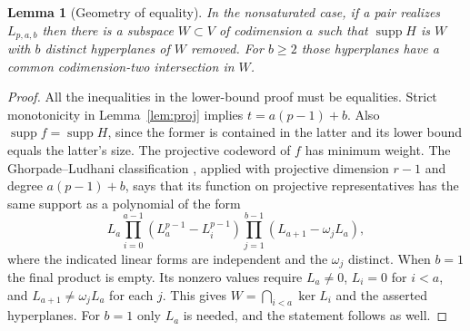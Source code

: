 \documentclass[11pt]{article}
\newtheorem{lemma}[theorem]{Lemma}
\theoremstyle{remark}\newtheorem{remark}[theorem]{Remark}
\newcommand{\supp}{\operatorname{supp}}
\begin{document}
\begin{lemma}[Geometry of equality]\label{lem:geometry}
In the nonsaturated case, if a pair realizes $L_{p,a,b}$ then there is a subspace $W\subset V$ of codimension $a$ such that $\supp H$ is $W$ with $b$ distinct hyperplanes of $W$ removed. For $b\ge2$ those hyperplanes have a common codimension-two intersection in $W$.
\end{lemma}
\begin{proof}
All the inequalities in the lower-bound proof must be equalities. Strict monotonicity in Lemma~\ref{lem:proj} implies $t=a(p-1)+b$. Also $\supp f=\supp H$, since the former is contained in the latter and its lower bound equals the latter's size. The projective codeword of $f$ has minimum weight. The Ghorpade--Ludhani classification \cite[Theorem 4.3]{GL}, applied with projective dimension $r-1$ and degree $a(p-1)+b$, says that its function on projective representatives has the same support as a polynomial of the form
\[
 L_a\prod_{i=0}^{a-1}(L_a^{p-1}-L_i^{p-1})
 \prod_{j=1}^{b-1}(L_{a+1}-\omega_jL_a),
\]
where the indicated linear forms are independent and the $\omega_j$ distinct. When $b=1$ the final product is empty. Its nonzero values require $L_a\ne0$, $L_i=0$ for $i<a$, and $L_{a+1}\ne\omega_j L_a$ for each $j$. This gives $W=\bigcap_{i<a}\ker L_i$ and the asserted hyperplanes. For $b=1$ only $L_a$ is needed, and the statement follows as well.
\end{proof}
\end{document}
